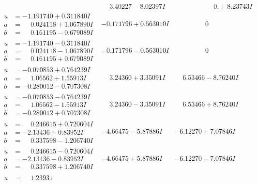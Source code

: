 \documentclass[1p]{elsarticle_modified}
\theoremstyle{definition}
\begin{document}
$$\begin{array}{c|c|c}
 & \phantom{-}3.40227 - 8.02397 I & \phantom{-0.000000 -}0. + 8.23743 I \\ \hline\begin{aligned}
u &= -1.191740 + 0.311840 I \\
a &= \phantom{-}0.024118 + 1.067890 I \\
b &= \phantom{-}0.161195 - 0.679089 I\end{aligned}
 & -0.171796 + 0.563010 I & \phantom{-0.000000 } 0 \\ \hline\begin{aligned}
u &= -1.191740 - 0.311840 I \\
a &= \phantom{-}0.024118 - 1.067890 I \\
b &= \phantom{-}0.161195 + 0.679089 I\end{aligned}
 & -0.171796 - 0.563010 I & \phantom{-0.000000 } 0 \\ \hline\begin{aligned}
u &= -0.070853 + 0.764239 I \\
a &= \phantom{-}1.06562 + 1.55913 I \\
b &= -0.280012 - 0.707308 I\end{aligned}
 & \phantom{-}3.24360 + 3.35091 I & \phantom{-}6.53466 - 8.76240 I \\ \hline\begin{aligned}
u &= -0.070853 - 0.764239 I \\
a &= \phantom{-}1.06562 - 1.55913 I \\
b &= -0.280012 + 0.707308 I\end{aligned}
 & \phantom{-}3.24360 - 3.35091 I & \phantom{-}6.53466 + 8.76240 I \\ \hline\begin{aligned}
u &= \phantom{-}0.246615 + 0.720604 I \\
a &= -2.13436 + 0.83952 I \\
b &= \phantom{-}0.337598 - 1.206740 I\end{aligned}
 & -4.66475 - 5.87886 I & -6.12270 + 7.07846 I \\ \hline\begin{aligned}
u &= \phantom{-}0.246615 - 0.720604 I \\
a &= -2.13436 - 0.83952 I \\
b &= \phantom{-}0.337598 + 1.206740 I\end{aligned}
 & -4.66475 + 5.87886 I & -6.12270 - 7.07846 I \\ \hline\begin{aligned}
u &= \phantom{-}1.23931\phantom{ +0.000000I} \\

\end{aligned}
\end{array}$$
\end{document}
